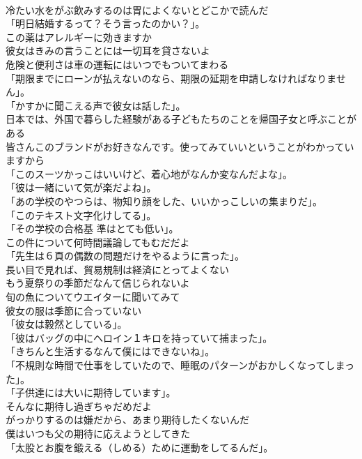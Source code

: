 \documentclass[8pt]{extreport}
\begin{document}
\begin{CJK}{UTF8}{min}
\\	冷たい水をがぶ飲みするのは胃によくないとどこかで読んだ	
\\	「明日結婚するって？そう言ったのかい？」。	
\\	この薬はアレルギーに効きますか	
\\	彼女はきみの言うことには一切耳を貸さないよ	
\\	危険と便利さは車の運転にはいつでもついてまわる	
\\	「期限までにローンが払えないのなら、期限の延期を申請しなければなりません」。	
\\	「かすかに聞こえる声で彼女は話した」。	
\\	日本では、外国で暮らした経験がある子どもたちのことを帰国子女と呼ぶことがある	
\\	皆さんこのブランドがお好きなんです。使ってみていいということがわかっていますから	
\\	「このスーツかっこはいいけど、着心地がなんか変なんだよな」。	
\\	「彼は一緒にいて気が楽だよね」。	
\\	「あの学校のやつらは、物知り顔をした、いいかっこしいの集まりだ」。	
\\	「このテキスト文字化けしてる」。	
\\	「その学校の合格基 準はとても低い」。	
\\	この件について何時間議論してもむだだよ	
\\	「先生は６頁の偶数の問題だけをやるように言った」。	
\\	長い目で見れば、貿易規制は経済にとってよくない	
\\	もう夏祭りの季節だなんて信じられないよ	
\\	旬の魚についてウエイターに聞いてみて	
\\	彼女の服は季節に合っていない	
\\	「彼女は毅然としている」。	
\\	「彼はバッグの中にヘロイン１キロを持っていて捕まった」。	
\\	「きちんと生活するなんて僕にはできないね」。	
\\	「不規則な時間で仕事をしていたので、睡眠のパターンがおかしくなってしまった」。	
\\	「子供達には大いに期待しています」。	
\\	そんなに期待し過ぎちゃだめだよ	
\\	がっかりするのは嫌だから、あまり期待したくないんだ	
\\	僕はいつも父の期待に応えようとしてきた	
\\	「太股とお腹を鍛える（しめる）ために運動をしてるんだ」。	

\end{CJK}
\end{document}
